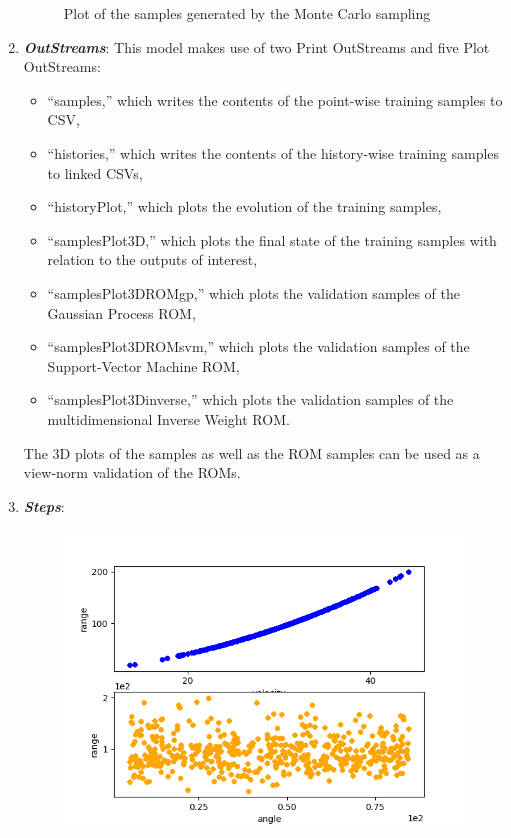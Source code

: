 \begin{enumerate}
\begin{figure}[h!]
  \caption{Plot of the samples generated by the Monte Carlo sampling}
  \label{fig:ROMgrid_pointsets}
 \end{figure}
   \item \textbf{\textit{OutStreams}}:
     This model makes use of two Print OutStreams and five Plot OutStreams:
     \begin{itemize}
       \item ``samples,'' which writes the contents of the point-wise training samples to CSV,
       \item ``histories,'' which writes the contents of the history-wise training samples to linked CSVs,
       \item ``historyPlot,'' which plots the evolution of the training samples,
       \item ``samplesPlot3D,'' which plots the final state of the training samples with relation to the
         outputs of interest,
       \item ``samplesPlot3DROMgp,'' which plots the validation samples of the Gaussian Process ROM,
       \item ``samplesPlot3DROMsvm,'' which plots the validation samples of the Support-Vector Machine ROM,
       \item ``samplesPlot3Dinverse,'' which plots the validation samples of the multidimensional Inverse
         Weight ROM.
     \end{itemize}
     The 3D plots of the samples as well as the ROM samples can be used as a view-norm validation of the ROMs.
   \item \textbf{\textit{Steps}}:
 \begin{figure}[h!]
  \centering
  \includegraphics[scale=0.7]{../../tests/framework/user_guide/ReducedOrderModeling/gold/ROMConstruction/1-historyPlot_scatter-scatter.png}

\end{figure}
\end{enumerate}
